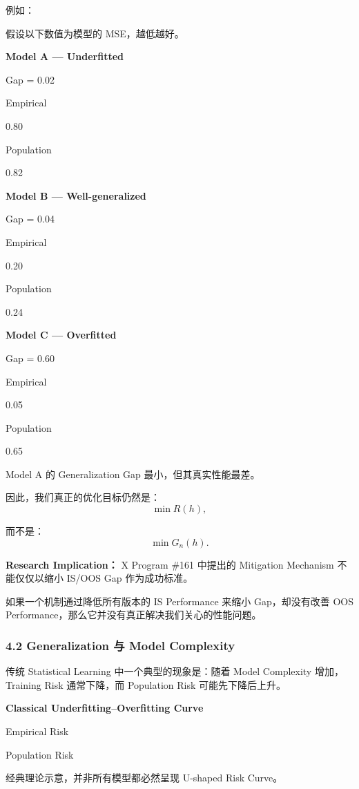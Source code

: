 例如：

假设以下数值为模型的 MSE，越低越好。

\textbf{Model A --- Underfitted}

Gap = 0.02

Empirical

0.80

Population

0.82

\textbf{Model B --- Well-generalized}

Gap = 0.04

Empirical

0.20

Population

0.24

\textbf{Model C --- Overfitted}

Gap = 0.60

Empirical

0.05

Population

0.65

Model A 的 Generalization Gap 最小，但其真实性能最差。

因此，我们真正的优化目标仍然是：
\[\min R(h),\]

而不是：
\[\min G_n(h).\]

\textbf{Research Implication：} X Program \#161 中提出的 Mitigation Mechanism 不能仅仅以缩小 IS/OOS Gap 作为成功标准。

如果一个机制通过降低所有版本的 IS Performance 来缩小 Gap，却没有改善 OOS Performance，那么它并没有真正解决我们关心的性能问题。

\hypertarget{part-2-12-0001-generalization-ux4e0e-model-complexity}{%
\subsubsection{4.2 Generalization 与 Model Complexity}\label{part-2-12-0001-generalization-ux4e0e-model-complexity}}

传统 Statistical Learning 中一个典型的现象是：随着 Model Complexity 增加，Training Risk 通常下降，而 Population Risk 可能先下降后上升。

\textbf{Classical Underfitting--Overfitting Curve}


Empirical Risk

Population Risk

经典理论示意，并非所有模型都必然呈现 U-shaped Risk Curve。

